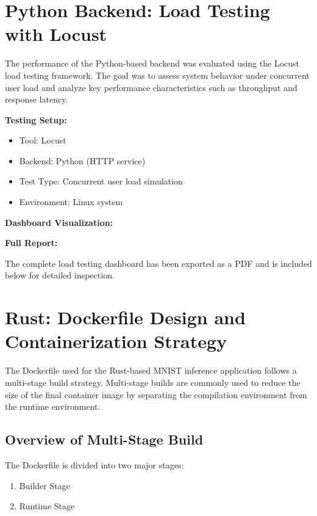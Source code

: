 \documentclass[11pt,a4paper]{article}
\begin{document}



\section{Python Backend: Load Testing with Locust}

The performance of the Python-based backend was evaluated using the Locust load testing framework. The goal was to assess system behavior under concurrent user load and analyze key performance characteristics such as throughput and response latency.

\textbf{Testing Setup:}
\begin{itemize}
    \item Tool: Locust
    \item Backend: Python (HTTP service)
    \item Test Type: Concurrent user load simulation
    \item Environment: Linux system
\end{itemize}

\textbf{Dashboard Visualization:}

\textbf{Full Report:}

The complete load testing dashboard has been exported as a PDF and is included below for detailed inspection.




\section{Rust: Dockerfile Design and Containerization Strategy}

The Dockerfile used for the Rust-based MNIST inference application follows a multi-stage build strategy. Multi-stage builds are commonly used to reduce the size of the final container image by separating the compilation environment from the runtime environment.

\subsection{Overview of Multi-Stage Build}

The Dockerfile is divided into two major stages:

\begin{enumerate}
    \item Builder Stage
    \item Runtime Stage
\end{enumerate}
\end{document}
